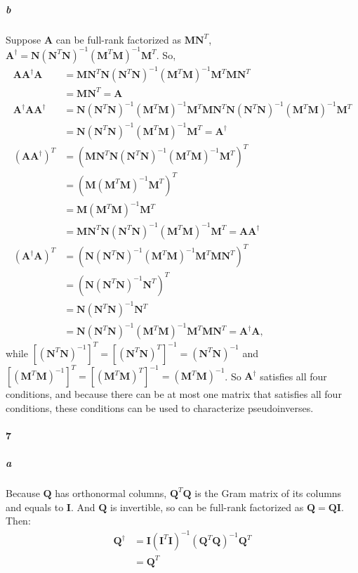 \documentclass[22pt]{article}
\begin{document}
		\subparagraph{b}Suppose $\mathbf{A}$ can be full-rank factorized as $\mathbf{MN}^T$, $\mathbf{A}^\dagger = \mathbf{N}(\mathbf{N}^T\mathbf{N})^{-1}(\mathbf{M}^T\mathbf{M})^{-1}\mathbf{M}^T$. So,
		\begin{align}
			\mathbf{AA}^\dagger\mathbf{A} & = \mathbf{MN}^T\mathbf{N}(\mathbf{N}^T\mathbf{N})^{-1}(\mathbf{M}^T\mathbf{M})^{-1}\mathbf{M}^T\mathbf{MN}^T\\
			& = \mathbf{MN}^T = \mathbf{A}\\
			\mathbf{A}^\dagger\mathbf{AA}^\dagger & = \mathbf{N}(\mathbf{N}^T\mathbf{N})^{-1}(\mathbf{M}^T\mathbf{M})^{-1}\mathbf{M}^T\mathbf{MN}^T\mathbf{N}(\mathbf{N}^T\mathbf{N})^{-1}(\mathbf{M}^T\mathbf{M})^{-1}\mathbf{M}^T\\
			& =  \mathbf{N}(\mathbf{N}^T\mathbf{N})^{-1}(\mathbf{M}^T\mathbf{M})^{-1}\mathbf{M}^T = \mathbf{A}^\dagger\\
			(\mathbf{AA}^\dagger)^T & = (\mathbf{MN}^T\mathbf{N}(\mathbf{N}^T\mathbf{N})^{-1}(\mathbf{M}^T\mathbf{M})^{-1}\mathbf{M}^T)^T\\
			& = (\mathbf{M}(\mathbf{M}^T\mathbf{M})^{-1}\mathbf{M}^T)^T\\
			& = \mathbf{M}(\mathbf{M}^T\mathbf{M})^{-1}\mathbf{M}^T\\
			& = \mathbf{MN}^T\mathbf{N}(\mathbf{N}^T\mathbf{N})^{-1}(\mathbf{M}^T\mathbf{M})^{-1}\mathbf{M}^T = \mathbf{AA}^\dagger\\
			(\mathbf{A}^\dagger\mathbf{A})^T & = (\mathbf{N}(\mathbf{N}^T\mathbf{N})^{-1}(\mathbf{M}^T\mathbf{M})^{-1}\mathbf{M}^T\mathbf{MN}^T)^T\\
			& = (\mathbf{N}(\mathbf{N}^T\mathbf{N})^{-1}\mathbf{N}^T)^T\\
			& = \mathbf{N}(\mathbf{N}^T\mathbf{N})^{-1}\mathbf{N}^T\\
			& = \mathbf{N}(\mathbf{N}^T\mathbf{N})^{-1}(\mathbf{M}^T\mathbf{M})^{-1}\mathbf{M}^T\mathbf{MN}^T = \mathbf{A}^\dagger\mathbf{A},
		\end{align}
		while $[(\mathbf{N}^T\mathbf{N})^{-1}]^T=[(\mathbf{N}^T\mathbf{N})^{T}]^{-1} = (\mathbf{N}^T\mathbf{N})^{-1}$ and $[(\mathbf{M}^T\mathbf{M})^{-1}]^T =[(\mathbf{M}^T\mathbf{M})^{T}]^{-1}= (\mathbf{M}^T\mathbf{M})^{-1}$.
		So $\mathbf{A}^\dagger$ satisfies all four conditions, and because there can be at most one matrix that satisfies all four conditions, these conditions can be used to characterize pseudoinverses.


	\paragraph{7}
		\subparagraph{a} Because $\mathbf{Q}$ has orthonormal columns, $\mathbf{Q}^T\mathbf{Q}$ is the Gram matrix of its columns and equals to $\mathbf{I}$. And $\mathbf{Q}$ is invertible, so can be full-rank factorized as $\mathbf{Q = QI}$. Then:
		\begin{align}
			\mathbf{Q}^\dagger & = \mathbf{I}(\mathbf{I}^T\mathbf{I})^{-1}(\mathbf{Q}^T\mathbf{Q})^{-1}\mathbf{Q}^T\\
			& = \mathbf{Q}^T
		\end{align}
\end{document}
